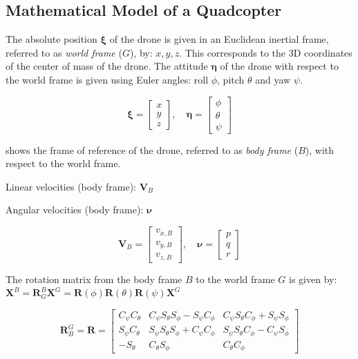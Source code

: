 \subsection{Mathematical Model of a Quadcopter}
\label{ssec:model}

The absolute position $\boldsymbol{\xi}$ of the drone is given in an Euclidean inertial frame, referred to as \textit{world frame} ($G$), by: $x, y, z$.
This corresponds to the 3D coordinates of the center of mass of the drone.
The attitude $\boldsymbol{\eta}$ of the drone with respect to the world frame is given using Euler angles: roll $\phi$, pitch $\theta$ and yaw $\psi$.

$$\boldsymbol{\xi}=\left[ \begin{array}{l}{x} \\ {y} \\ {z}\end{array}\right],
 \quad \boldsymbol{\eta}=\left[ \begin{array}{l}{\phi} \\ {\theta} \\ {\psi}\end{array}\right]$$

 shows the frame of reference of the drone, referred to as \textit{body frame} ($B$), with respect to the world frame.

Linear velocities (body frame): $\boldsymbol{V}_{B}$

Angular velocities (body frame): $\boldsymbol{\nu}$

$$\boldsymbol{V}_{B}=\left[ \begin{array}{c}{v_{x, B}} \\ {v_{y, B}} \\ {v_{z, B}}\end{array}\right], \quad \boldsymbol{\nu}=\left[ \begin{array}{l}{p} \\ {q} \\ {r}\end{array}\right]$$

The rotation matrix from the body frame $B$ to the world frame $G$ is given by:
$\mathbf{X}^{B}=\mathbf{R}_{G}^{B} \mathbf{X}^{G}=\mathbf{R}(\phi) \mathbf{R}(\theta) \mathbf{R}(\psi) \mathbf{X}^{G}$

$$\boldsymbol{R}_B^G=\boldsymbol{R}=\left[ \begin{array}{ccc}{C_{\psi} C_{\theta}} & {C_{\psi} S_{\theta} S_{\phi}-S_{\psi} C_{\phi}} & {C_{\psi} S_{\theta} C_{\phi}+S_{\psi} S_{\phi}} \\ {S_{\psi} C_{\theta}} & {S_{\psi} S_{\theta} S_{\phi}+C_{\psi} C_{\phi}} & {S_{\psi} S_{\theta} C_{\phi}-C_{\psi} S_{\phi}} \\ {-S_{\theta}} & {C_{\theta} S_{\phi}} & {C_{\theta} C_{\phi}}\end{array}\right]$$

